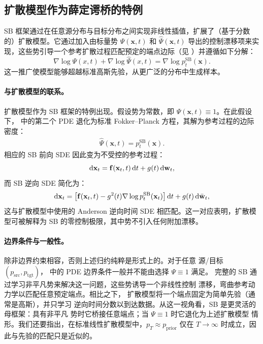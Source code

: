 \subsection{扩散模型作为薛定谔桥的特例}

SB 框架通过在任意源分布与目标分布之间实现非线性插值，扩展了（基于分数的）扩散模型。它通过加入由标量势 $\Psi(\mathbf{x}, t)$ 和 $\widehat{\Psi}(\mathbf{x}, t)$ 导出的控制漂移项来实现，这些势引导一个参考扩散过程匹配预定的端点边际（见 ）并遵循如下分解：
\[
\nabla\log{\Psi(x,t)}+\nabla\log{\hat{\Psi}(x,t)}=\nabla \log p_t^{\mathrm{SB}}(\mathbf{x}).
\]
这一推广使模型能够超越标准高斯先验，从更广泛的分布中生成样本。

\paragraph{与扩散模型的联系。}

扩散模型作为 SB 框架的特例出现。假设势为常数，即 $\Psi(\mathbf{x}, t) \equiv 1$。在此假设下， 中的第二个 PDE 退化为标准 Fokker–Planck 方程，其解为参考过程的边际密度：
\begin{align}\label{eq:sb-backward-potential}
    \widehat{\Psi}(\mathbf{x}, t) = p_t^{\mathrm{SB}}(\mathbf{x}).
\end{align}
相应的 SB 前向 SDE 因此变为不受控的参考过程：
\[
    \mathop{}\!\mathrm{d}\mathbf{x}_t = \mathbf{f}(\mathbf{x}_t, t)\mathop{}\!\mathrm{d} t + g(t)\mathop{}\!\mathrm{d}\mathbf{w}_t,
\]
而 SB 逆向 SDE 简化为：
\[
    \mathop{}\!\mathrm{d}\mathbf{x}_t = \left[\mathbf{f}(\mathbf{x}_t, t) - g^2(t) \nabla \log p_t^{\mathrm{SB}}(\mathbf{x}_t) \right]\mathop{}\!\mathrm{d} t + g(t)\mathop{}\!\mathrm{d}\bar{\mathbf{w}}_t,
\]
这与扩散模型中使用的 Anderson 逆向时间 SDE 相匹配。这一对应表明，扩散模型可被解释为 SB 的零控制极限，其中势不引入任何附加漂移。

\paragraph{边界条件与一般性。}
除非边界约束相容，否则上述归约纯粹是形式上的。对于任意
源/目标 $(p_{\mathrm{src}},p_{\mathrm{tgt}})$， 中的 PDE 边界条件一般并不能由选择 $\Psi\equiv 1$ 满足。
完整的 SB 通过学习非平凡势来解决这一问题，这些势诱导一个非线性控制
漂移，弯曲参考动力学以匹配任意预定端点。相比之下，
扩散模型将一个端点固定为简单先验（通常是高斯），并只学习
逆向时间分数以到达数据。从这一视角看，SB 是更灵活的母框架：具有非平凡
势时它桥接任意端点；当 $\Psi\equiv 1$ 时它退化为上述扩散模型
情形。我们还要指出，在标准线性扩散模型中，$p_T \approx p_{\mathrm{prior}}$ 仅在 $T \to \infty$ 时成立，因此与先验的匹配只是近似的。



